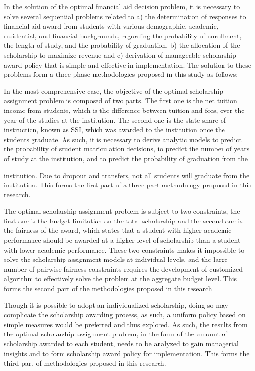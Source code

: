 \documentclass[12pt,english]{report}
\begin{document}
In the solution of the optimal financial aid decision problem,  it is necessary
to solve several sequential problems related to a) the determination of
responses to financial aid award from students with various demographic,
academic, residential, and financial backgrounds, regarding the probability of
enrollment, the length of study, and the probability of graduation, b) the
allocation of the scholarship to maximize revenue and c) derivation of
manageable 
scholarship award policy that is simple and effective in implementation.
The solution to these problems form a three-phase methodologies proposed
in this study as follows:


In the most comprehensive case, the objective of the optimal scholarship
assignment problem is composed of two parts. The first one is the net tuition
income from students, which is the difference between tuition and fees, over 
the year of the studies at the institution. The second one is the state share
of
instruction, known as SSI, which was awarded to the institution once the
students
graduate.  As such,  it is necessary to derive analytic models to predict
the probability of student matriculation decisions, to predict the number of
years of 
study at the institution, and to predict the probability of graduation from the

institution. Due to dropout and transfers, not all students will graduate from
the
institution. This forms the first part of a three-part methodology proposed
in this research.

The optimal scholarship assignment problem is subject to two constraints, the
first one is the budget limitation on the total scholarship and the second one
is the fairness of the award, which states that  a student with higher
academic performance should be awarded at a higher level of scholarship than
a student with lower academic performance.  These two constraints makes it
impossible to solve the scholarship assignment models at individual levels, and
the large number of pairwise fairness constraints requires the development of
customized algorithm to effectively solve the problem at the aggregate budget
level.  This forms the second part of the methodologies proposed in this
research

Though it is possible to adopt an individualized scholarship, doing so may
complicate the scholarship awarding process, as such, a uniform policy based on
simple measures would be preferred and thus explored.  As such, the results
from the optimal scholarship assignment problem, in the form of the amount of
scholarship awarded to each student, needs to be analyzed to gain managerial
insights and to form scholarship award policy for implementation.  This forms
the third part of methodologies proposed in this research.
\end{document}
